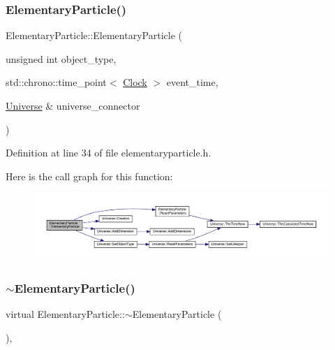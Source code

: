 \subsubsection{\texorpdfstring{Elementary\+Particle()}{ElementaryParticle()}\hspace{0.1cm}{\footnotesize\ttfamily [4/4]}}
{\footnotesize\ttfamily Elementary\+Particle\+::\+Elementary\+Particle (\begin{DoxyParamCaption}\item[{unsigned int}]{object\+\_\+type,  }\item[{std\+::chrono\+::time\+\_\+point$<$ \mbox{\hyperlink{universe_8h_a0ef8d951d1ca5ab3cfaf7ab4c7a6fd80}{Clock}} $>$}]{event\+\_\+time,  }\item[{\mbox{\hyperlink{class_universe}{Universe}} \&}]{universe\+\_\+connector }\end{DoxyParamCaption})\hspace{0.3cm}{\ttfamily [inline]}}



Definition at line 34 of file elementaryparticle.\+h.

Here is the call graph for this function\+:\nopagebreak
\begin{figure}[H]
\begin{center}
\leavevmode
\includegraphics[width=350pt]{class_elementary_particle_a0b43033247b36096d0de2a7553c620a9_cgraph}
\end{center}
\end{figure}
\mbox{\label{class_elementary_particle_a5adce47bf88a5381c88a4d40f87fe76f}} 
\subsubsection{\texorpdfstring{$\sim$\+Elementary\+Particle()}{~ElementaryParticle()}}
{\footnotesize\ttfamily virtual Elementary\+Particle\+::$\sim$\+Elementary\+Particle (\begin{DoxyParamCaption}{ }\end{DoxyParamCaption})\hspace{0.3cm}{\ttfamily [inline]}, {\ttfamily [virtual]}}

